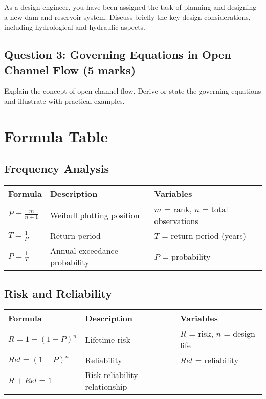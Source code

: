 \documentclass[11pt,a4paper]{article}
\begin{document}
As a design engineer, you have been assigned the task of planning and designing a new dam and reservoir system. Discuss briefly the key design considerations, including hydrological and hydraulic aspects. 

\vspace{5cm}

\subsection*{Question 3: Governing Equations in Open Channel Flow (5 marks)}

Explain the concept of open channel flow. Derive or state the governing equations and illustrate with practical examples.

\vspace{5cm}

\newpage

\section*{Formula Table}

\subsection*{Frequency Analysis}
\renewcommand{\arraystretch}{1.5}
\begin{tabular}{|l|l|l|}
\hline
\textbf{Formula} & \textbf{Description} & \textbf{Variables} \\
\hline
$P = \frac{m}{n+1}$ & Weibull plotting position & $m$ = rank, $n$ = total observations \\
$T = \frac{1}{P}$ & Return period & $T$ = return period (years) \\
$P = \frac{1}{T}$ & Annual exceedance probability & $P$ = probability \\
\hline
\end{tabular}

\subsection*{Risk and Reliability}
\begin{tabular}{|l|l|l|}
\hline
\textbf{Formula} & \textbf{Description} & \textbf{Variables} \\
\hline
$R = 1-(1-P)^n$ & Lifetime risk & $R$ = risk, $n$ = design life \\
$Rel = (1-P)^n$ & Reliability & $Rel$ = reliability \\
$R + Rel = 1$ & Risk-reliability relationship & \\
\hline
\end{tabular}
\end{document}
